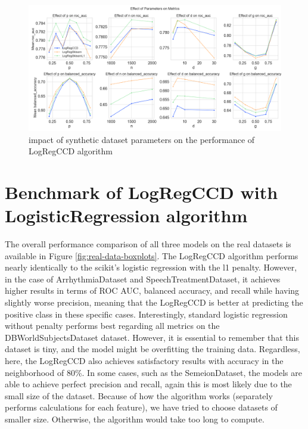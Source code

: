 \documentclass[11pt]{article}
\begin{document}
\begin{figure}[h]
    \centering
  \includegraphics[width=\textwidth]{../results/parameter_facet_grid.png}
    \caption{impact of synthetic dataset parameters on the performance of LogRegCCD algorithm}
    \label{fig:synthetic-dataset-parameters}
  \end{figure}

\section{Benchmark of LogRegCCD with LogisticRegression algorithm}

The overall performance comparison of all three models on the real datasets is available in Figure \ref{fig:real-data-boxplots}. The LogRegCCD algorithm performs nearly identically to the scikit's logistic regression with the l1 penalty. However, in the case of ArrhythmiaDataset and SpeechTreatmentDataset, it achieves higher results in terms of ROC AUC, balanced accuracy, and recall while having slightly worse precision, meaning that the LogRegCCD is better at predicting the positive class in these specific cases. Interestingly, standard logistic regression without penalty performs best regarding all metrics on the DBWorldSubjectsDataset dataset. However, it is essential to remember that this dataset is tiny, and the model might be overfitting the training data. Regardless, here, the LogRegCCD also achieves satisfactory results with accuracy in the neighborhood of 80\%. In some cases, such as the SemeionDataset, the models are able to achieve perfect precision and recall, again this is most likely due to the small size of the dataset. Because of how the algorithm works (separately performs calculations for each feature), we have tried to choose datasets of smaller size. Otherwise, the algorithm would take too long to compute.\par
\end{document}
